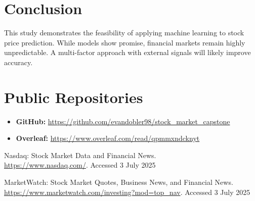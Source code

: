 \documentclass[runningheads]{llncs}
\begin{document}
\section{Conclusion}
This study demonstrates the feasibility of applying machine learning to stock price prediction. While models show promise, financial markets remain highly unpredictable. A multi-factor approach with external signals will likely improve accuracy.

\section*{Public Repositories}
\begin{itemize}
    \item \textbf{GitHub:} \url{https://github.com/evandobler98/stock_market_capstone}
    \item \textbf{Overleaf:} \url{https://www.overleaf.com/read/qpmmxndcknyt}
\end{itemize}

\begin{thebibliography}{2}

Nasdaq: Stock Market Data and Financial News.\\
\url{https://www.nasdaq.com/}. Accessed 3 July 2025

MarketWatch: Stock Market Quotes, Business News, and Financial News.\\
\url{https://www.marketwatch.com/investing?mod=top_nav}. Accessed 3 July 2025

\end{thebibliography}
\end{document}
